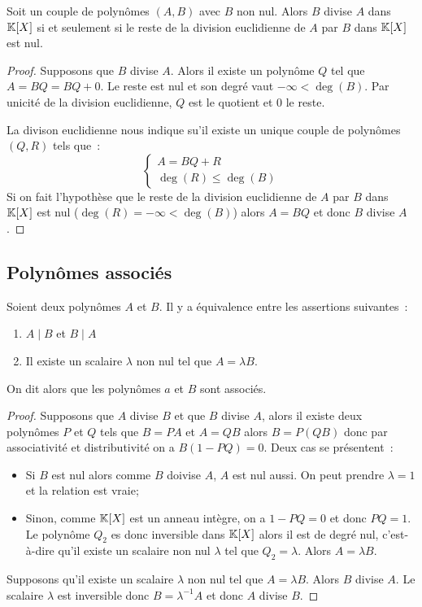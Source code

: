 \begin{prop}
  Soit un couple de polynômes $(A,B)$ avec $B$ non nul. Alors $B$ divise $A$ dans $\mathbb{K}[X]$ si et seulement si le reste de la division euclidienne de $A$ par $B$ dans $\mathbb{K}[X]$ est nul.
\end{prop}
\begin{proof}
  Supposons que $B$ divise $A$. Alors il existe un polynôme $Q$ tel que $A=BQ = BQ+0$. Le reste est nul et son degré vaut $-\infty < \deg(B)$. Par unicité de la division euclidienne, $Q$ est le quotient et $0$ le reste.

  La divison euclidienne nous indique su'il existe un unique couple de polynômes $(Q,R)$ tels que~:
  \begin{equation}
    \begin{cases}
      A=BQ+R \\ \deg(R) \leq \deg(B)
    \end{cases}
  \end{equation}
  Si on fait l'hypothèse que le reste de la division euclidienne de $A$ par $B$ dans $\mathbb{K}[X]$ est nul ($\deg(R)=-\infty<\deg(B)$) alors $A=BQ$ et donc $B$ divise $A$.
\end{proof}

\subsection{Polynômes associés}

\begin{prop}
  Soient deux polynômes $A$ et $B$. Il y a équivalence entre les assertions suivantes~:
  \begin{enumerate}
  \item $A\mid{}B$ et $B\mid{}A$
  \item Il existe un scalaire $\lambda$ non nul tel que $A=\lambda B$.
  \end{enumerate}
  On dit alors que les polynômes $a$ et $B$ sont associés.
\end{prop}

\begin{proof}
  Supposons que $A$ divise $B$ et que $B$ divise $A$, alors il existe deux polynômes $P$ et $Q$ tels que $B=PA$ et $A=QB$ alors $B=P(QB)$ donc par associativité et distributivité on a $B(1-PQ)=0$. Deux cas se présentent~:
  \begin{itemize}
  \item Si $B$ est nul alors comme $B$ doivise $A$, $A$ est nul aussi. On peut prendre $\lambda=1$ et la relation est vraie;
  \item Sinon, comme $\mathbb{K}[X]$ est un anneau intègre, on a $1-PQ=0$ et donc $PQ=1$. Le polynôme $Q_2$ es donc inversible dans $\mathbb{K}[X]$ alors il est de degré nul, c'est-à-dire qu'il existe un scalaire non nul $\lambda$ tel que $Q_2=\lambda$. Alors $A=\lambda B$.
  \end{itemize}

  Supposons qu'il existe un scalaire $\lambda$ non nul tel que $A=\lambda B$. Alors $B$ divise $A$. Le scalaire $\lambda$ est inversible donc $B=\lambda^{-1}A$ et donc $A$ divise $B$.
\end{proof}

